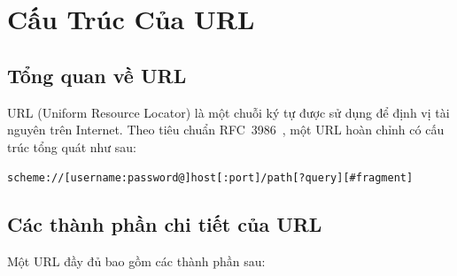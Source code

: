 \documentclass[a4paper,12pt]{article}
\begin{document}
\newpage
\tableofcontents
\newpage

\section{Cấu Trúc Của URL}
\label{sec:url_structure}

\subsection{Tổng quan về URL}

URL (Uniform Resource Locator) là một chuỗi ký tự được sử dụng để định vị tài nguyên trên Internet. Theo tiêu chuẩn RFC~3986~\cite{rfc3986}, một URL hoàn chỉnh có cấu trúc tổng quát như sau:

\begin{center}
\texttt{scheme://[username:password@]host[:port]/path[?query][\#fragment]}
\end{center}

\subsection{Các thành phần chi tiết của URL}

Một URL đầy đủ bao gồm các thành phần sau:
\end{document}

